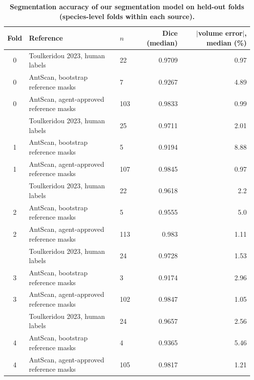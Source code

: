 \begin{table}[htbp]
\centering
\caption[Segmentation accuracy on held-out folds (species-level folds within each source)]{\textbf{Segmentation accuracy of our segmentation model on held-out folds (species-level folds within each source).}}
\label{tab:S2}
\footnotesize
\begin{tabular}{@{}cllrr@{}}
\toprule
Fold & Reference & $n$ & Dice (median) & $|$volume error$|$, median (\%) \\
\midrule
0 & Toulkeridou 2023, human labels & 22 & 0.9709 & 0.97 \\
0 & AntScan, bootstrap reference masks & 7 & 0.9267 & 4.89 \\
0 & AntScan, agent-approved reference masks & 103 & 0.9833 & 0.99 \\
\addlinespace
1 & Toulkeridou 2023, human labels & 25 & 0.9711 & 2.01 \\
1 & AntScan, bootstrap reference masks & 5 & 0.9194 & 8.88 \\
1 & AntScan, agent-approved reference masks & 107 & 0.9845 & 0.97 \\
\addlinespace
2 & Toulkeridou 2023, human labels & 22 & 0.9618 & 2.2 \\
2 & AntScan, bootstrap reference masks & 5 & 0.9555 & 5.0 \\
2 & AntScan, agent-approved reference masks & 113 & 0.983 & 1.11 \\
\addlinespace
3 & Toulkeridou 2023, human labels & 24 & 0.9728 & 1.53 \\
3 & AntScan, bootstrap reference masks & 3 & 0.9174 & 2.96 \\
3 & AntScan, agent-approved reference masks & 102 & 0.9847 & 1.05 \\
\addlinespace
4 & Toulkeridou 2023, human labels & 24 & 0.9657 & 2.56 \\
4 & AntScan, bootstrap reference masks & 4 & 0.9365 & 5.46 \\
4 & AntScan, agent-approved reference masks & 105 & 0.9817 & 1.21 \\
\bottomrule
\end{tabular}
\end{table}
